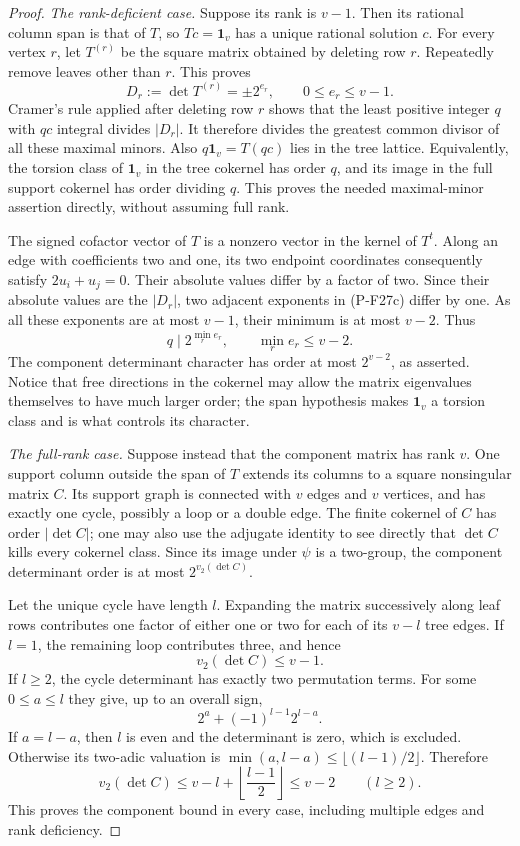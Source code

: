 \begin{proof}
\emph{The rank-deficient case.}
Suppose its rank is $v-1$. Then its rational column span
is that of $T$, so $Tc=\mathbf1_v$ has a unique rational
solution $c$. For every vertex $r$, let $T^{(r)}$ be the
square matrix obtained by deleting row $r$. Repeatedly
remove leaves other than $r$. This proves
\[
 D_r:=\det T^{(r)}=\pm2^{e_r},\qquad 0\le e_r\le v-1.
 \tag{P-F27c}
\]
Cramer's rule applied after deleting row $r$ shows that
the least positive integer $q$ with $qc$ integral divides
$|D_r|$. It therefore divides the greatest common divisor
of all these maximal minors. Also
$q\mathbf1_v=T(qc)$ lies in the tree lattice. Equivalently,
the torsion class of $\mathbf1_v$ in the tree cokernel has
order $q$, and its image in the full support cokernel has
order dividing $q$. This proves the needed maximal-minor
assertion directly, without assuming full rank.

The signed cofactor vector of $T$ is a nonzero vector
in the kernel of $T^t$. Along an edge with coefficients
two and one, its two endpoint coordinates consequently
satisfy $2u_i+u_j=0$. Their absolute values differ by a
factor of two. Since their absolute values are the
$|D_r|$, two adjacent exponents in (P-F27c) differ by one.
As all these exponents are at most $v-1$, their minimum
is at most $v-2$. Thus
\[
 q\mid 2^{\min_r e_r},\qquad \min_r e_r\le v-2.
 \tag{P-F27d}
\]
The component determinant character has order at most
$2^{v-2}$, as asserted. Notice that free directions in
the cokernel may allow the matrix eigenvalues themselves
to have much larger order; the span hypothesis makes
$\mathbf1_v$ a torsion class and is what controls its
character.

\emph{The full-rank case.}
Suppose instead that the component matrix has rank $v$.
One support column outside the span of $T$ extends its
columns to a square nonsingular matrix $C$. Its support
graph is connected with $v$ edges and $v$ vertices, and
has exactly one cycle, possibly a loop or a double edge.
The finite cokernel of $C$ has order $|\det C|$; one may
also use the adjugate identity to see directly that
$\det C$ kills every cokernel class. Since its image under
$\psi$ is a two-group, the component determinant order
is at most $2^{v_2(\det C)}$.

Let the unique cycle have length $l$. Expanding the
matrix successively along leaf rows contributes one
factor of either one or two for each of its $v-l$
tree edges. If $l=1$, the remaining loop contributes
three, and hence
\[
 v_2(\det C)\le v-1.
 \tag{P-F27e}
\]
If $l\ge2$, the cycle determinant has exactly two
permutation terms. For some $0\le a\le l$ they give,
up to an overall sign,
\[
 2^a+(-1)^{l-1}2^{l-a}.
 \tag{P-F27f}
\]
If $a=l-a$, then $l$ is even and the determinant is zero,
which is excluded. Otherwise its two-adic valuation is
$\min(a,l-a)\le\lfloor(l-1)/2\rfloor$. Therefore
\[
 v_2(\det C)
 \le v-l+\left\lfloor\frac{l-1}{2}\right\rfloor
 \le v-2\qquad(l\ge2).
 \tag{P-F27g}
\]
This proves the component bound in every case, including
multiple edges and rank deficiency.


\end{proof}
